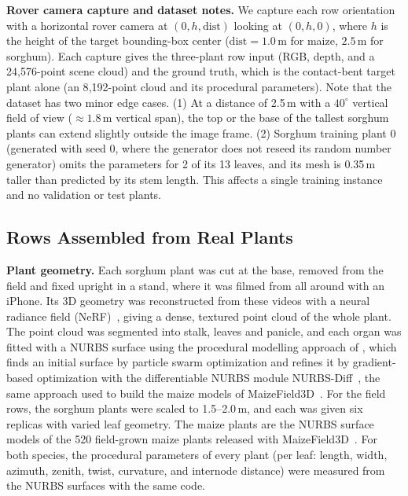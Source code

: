 \documentclass[10pt,twocolumn,letterpaper]{article}
\begin{document}
\noindent\textbf{Rover camera capture and dataset notes.}
We capture each row orientation with a horizontal rover camera at $(0, h, \mathrm{dist})$ looking at $(0, h, 0)$, where $h$ is the height of the target bounding-box center ($\mathrm{dist} = 1.0$\,m for maize, $2.5$\,m for sorghum). Each capture gives the three-plant row input (RGB, depth, and a 24{,}576-point scene cloud) and the ground truth, which is the contact-bent target plant alone (an 8{,}192-point cloud and its procedural parameters). Note that the dataset has two minor edge cases. (1) At a distance of 2.5\,m with a $40^\circ$ vertical field of view ($\approx 1.8$\,m vertical span), the top or the base of the tallest sorghum plants can extend slightly outside the image frame. (2) Sorghum training plant 0 (generated with seed 0, where the generator does not reseed its random number generator) omits the parameters for 2 of its 13 leaves, and its mesh is 0.35\,m taller than predicted by its stem length. This affects a single training instance and no validation or test plants.

\subsection{Rows Assembled from Real Plants}
\label{sec:supp-real-rows}
\noindent\textbf{Plant geometry.}
Each sorghum plant was cut at the base, removed from the field and fixed upright in a stand, where it was filmed from all
around with an iPhone. Its 3D geometry was reconstructed from these videos with a neural radiance field
(NeRF)~\citep{arshad2024nerf_field}, giving a dense, textured point cloud of the whole plant. The point cloud was
segmented into stalk, leaves and panicle, and each organ was fitted with a NURBS surface using the procedural modelling
approach of \citet{hadadi2025procmaize}, which finds an initial surface by particle swarm optimization and refines it
by gradient-based optimization with the differentiable NURBS module NURBS-Diff~\citep{nurbsdiff2022}, the same approach
used to build the maize models of MaizeField3D~\citep{maizefield3d2025}. For the field
rows, the sorghum plants were scaled to 1.5--2.0\,m, and each was given six replicas with varied leaf geometry. The maize
plants are the NURBS surface models of the 520 field-grown maize plants released with
MaizeField3D~\citep{maizefield3d2025}. For both species, the procedural parameters of every plant (per leaf: length,
width, azimuth, zenith, twist, curvature, and internode distance) were measured from the NURBS surfaces with the same
code.
\end{document}
